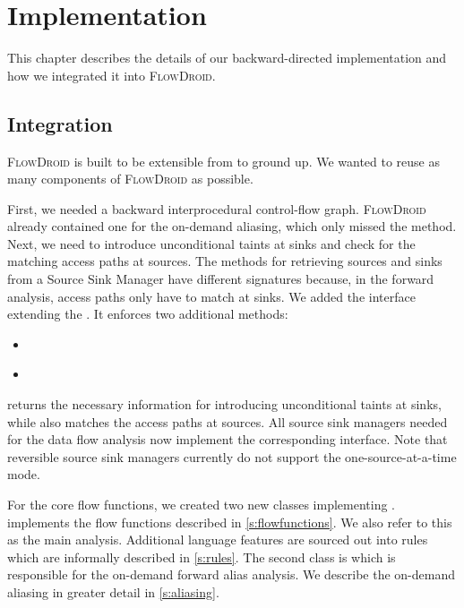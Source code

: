 \documentclass[../draft.tex]{subfiles}
\begin{document}
    \chapter{Implementation}
    This chapter describes the details of our backward-directed implementation and how we integrated it into \textsc{FlowDroid}.

    \section{Integration}
    \textsc{FlowDroid} is built to be extensible from to ground up. We wanted to reuse as many components of \textsc{FlowDroid} as possible. 
    
    First, we needed a backward interprocedural control-flow graph. \textsc{FlowDroid} already contained one for the on-demand aliasing, which only missed the  method.
    Next, we need to introduce unconditional taints at sinks and check for the matching access paths at sources.
    The methods for retrieving sources and sinks from a Source Sink Manager have different signatures because, in the forward analysis, access paths only have to match at sinks. We added the interface  extending the . It enforces two additional methods:
    \begin{itemize}
        \item {}\\
        \item {}\\
    \end{itemize}
     returns the necessary information for introducing unconditional taints at sinks, while  also matches the access paths at sources.
    All source sink managers needed for the data flow analysis now implement the corresponding interface.
    Note that reversible source sink managers currently do not support the one-source-at-a-time mode.

    For the core flow functions, we created two new classes implementing .  implements the flow functions described in \autoref{s:flowfunctions}. We also refer to this as the main analysis. Additional language features are sourced out into rules which are informally described in \autoref{s:rules}. The second class is  which is responsible for the on-demand forward alias analysis. We describe the on-demand aliasing in greater detail in \autoref{s:aliasing}.
\end{document}

